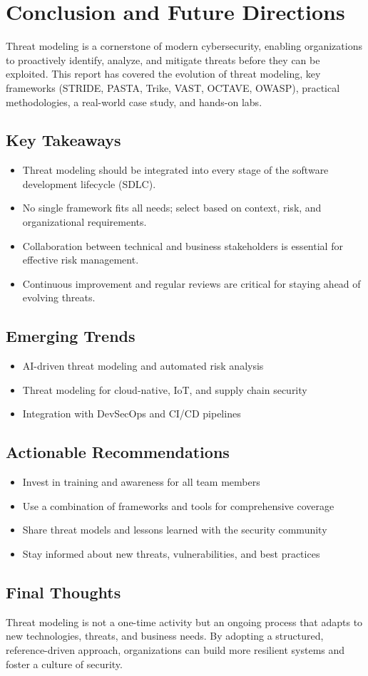 
\section*{Conclusion and Future Directions}
Threat modeling is a cornerstone of modern cybersecurity, enabling organizations to proactively identify, analyze, and mitigate threats before they can be exploited\cite{shostack2014,uceda2015,owasp}. This report has covered the evolution of threat modeling, key frameworks (STRIDE, PASTA, Trike, VAST, OCTAVE, OWASP), practical methodologies, a real-world case study, and hands-on labs.

\subsection*{Key Takeaways}
\begin{itemize}
	\item Threat modeling should be integrated into every stage of the software development lifecycle (SDLC)\cite{shostack2014}.
	\item No single framework fits all needs; select based on context, risk, and organizational requirements\cite{uceda2015}.
	\item Collaboration between technical and business stakeholders is essential for effective risk management\cite{nist800154}.
	\item Continuous improvement and regular reviews are critical for staying ahead of evolving threats\cite{owasp}.
\end{itemize}

\subsection*{Emerging Trends}
\begin{itemize}
	\item AI-driven threat modeling and automated risk analysis\cite{owasp}
	\item Threat modeling for cloud-native, IoT, and supply chain security\cite{nist800154}
	\item Integration with DevSecOps and CI/CD pipelines\cite{owasp}
\end{itemize}

\subsection*{Actionable Recommendations}
\begin{itemize}
	\item Invest in training and awareness for all team members
	\item Use a combination of frameworks and tools for comprehensive coverage
	\item Share threat models and lessons learned with the security community
	\item Stay informed about new threats, vulnerabilities, and best practices\cite{owasp,shostack2014}
\end{itemize}

\subsection*{Final Thoughts}
Threat modeling is not a one-time activity but an ongoing process that adapts to new technologies, threats, and business needs. By adopting a structured, reference-driven approach, organizations can build more resilient systems and foster a culture of security.
